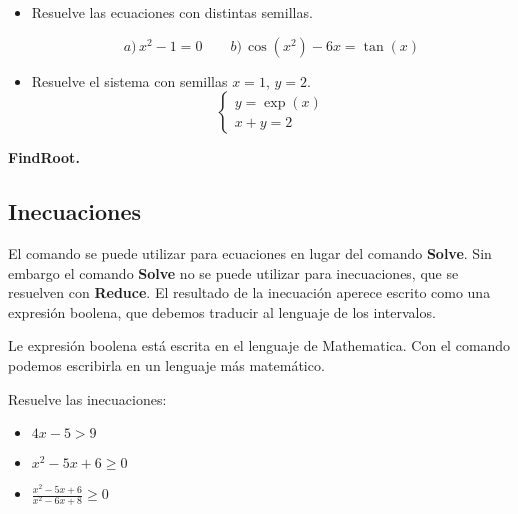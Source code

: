 \documentclass[a4paper,10pt, draft]{article}
\newcommand{\com}[1]{\textbf{\color{blue}{#1}}}
\newenvironment{ejer}{\begin{tcolorbox}[center title, title=Ejercicios,
fonttitle=\sffamily\bfseries,colback=blue!5,colframe=orange]}{\end{tcolorbox}}
\newenvironment{funciones}{\begin{tcolorbox}[center title, title=Nuevas funciones, fonttitle=\sffamily\bfseries, colback=green!5!white,colframe=red!75!black]}{\end{tcolorbox}\bigskip}
\begin{document}
\begin{ejer}

\begin{itemize}

\item Resuelve las ecuaciones con distintas semillas.

$$
a)\, x^2-1=0 \qquad b)\, \cos(x^2)-6x= \tan(x)
$$

\item Resuelve el sistema con semillas $x=1$, $y=2$.
$$
\begin{cases}
y =\exp(x)\\
x + y = 2
\end{cases}
$$

\end{itemize}



\end{ejer} 

\enlargethispage{1 cm}

\begin{funciones}

\textbf{FindRoot.}

\end{funciones}


 \newpage


\subsection{Inecuaciones}

El comando   \com{Reduce[p,x]} se puede utilizar para ecuaciones en lugar del comando \textbf{Solve}. Sin embargo el comando \textbf{Solve} no se puede utilizar para inecuaciones, que se resuelven con \textbf{Reduce}. El resultado de la inecuación  aperece escrito como una expresión boolena, que debemos traducir al lenguaje de los intervalos.


Le expresión boolena está escrita en el lenguaje de Mathematica. Con el comando \com{TraditionalForm} podemos escribirla en un lenguaje más matemático.


\begin{ejer}

Resuelve las inecuaciones:

\begin{itemize}


\item  $4x-5>9$


\item $x^2-5x+6 \geq 0$


\item $\displaystyle\frac{x^2-5x+6}{x^2-6x+8} \geq 0$

\end{itemize}

\end{ejer} 
\end{document}
